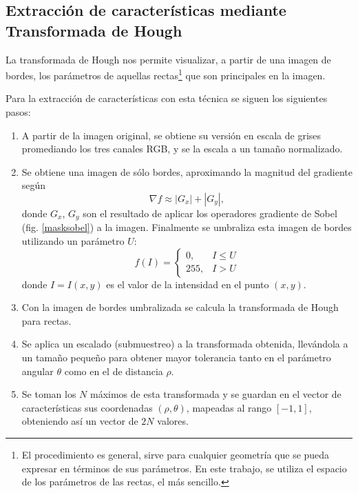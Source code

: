 \documentclass[conference,a4paper,10pt,oneside,final]{tfmpd}
\begin{document}
\subsection{Extracción de características mediante Transformada de Hough}
La transformada de Hough nos permite visualizar, a partir de una imagen de
bordes, los parámetros de aquellas rectas\footnote{El procedimiento es general,
sirve para cualquier geometría que se pueda expresar en términos de sus
parámetros. En este trabajo, se utiliza el espacio de los parámetros de las
rectas, el más sencillo.}
que son principales en la imagen.

Para la extracción de características con esta técnica se siguen los siguientes
pasos:
\begin{enumerate}
\item A partir de la imagen original, se obtiene su versión en escala de grises
      promediando los tres canales RGB, y se la escala a un tamaño normalizado.
\item Se obtiene una imagen de sólo bordes, aproximando la magnitud del
      gradiente según
      \begin{equation}
      \label{sob}
      \nabla f \approx |G_x| + |G_y|,
      \end{equation}
      donde $G_x$, $G_y$ son el resultado de aplicar los o\-pe\-ra\-do\-res
      gradiente  de Sobel \cite{gonzalez+woods} (fig. \ref{masksobel}) a la
      imagen.
      Finalmente se umbraliza esta imagen de bordes utilizando un parámetro $U$:
      \begin{equation}
      \label{umbral}
      f(I)=
      \begin{cases}
      0, & I\leq U\\
      255, & I > U
      \end{cases}
      \end{equation}
      {donde $I=I(x,y)$ es el valor de la intensidad en el punto $(x,y)$.}
\item Con la imagen de bordes umbralizada se calcula la transformada de
      Hough para rectas.
\item Se aplica un escalado (submuestreo) a la transformada obtenida, llevándola
      a un tamaño pequeño
      para obtener mayor tolerancia tanto en el parámetro angular
      $\theta$ como en el de distancia $\rho$.
\item Se toman los $N$ máximos de esta transformada y se guardan en el vector de
      características sus coordenadas $(\rho,\theta)$, mapeadas al rango
      $[-1,1]$, obteniendo así un vector de $2N$ valores.
\end{enumerate}
\end{document}
